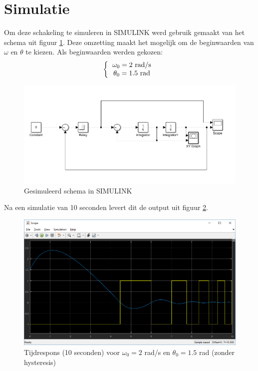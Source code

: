 \documentclass[12pt]{article}
\begin{document}
\section{Simulatie}
Om deze schakeling te simuleren in SIMULINK werd gebruik gemaakt van het schema uit figuur \ref{simulinkschema}. Deze omzetting maakt het mogelijk om de beginwaarden van $\omega$ en $\theta$ te kiezen. Als beginwaarden werden gekozen:
\[ 
\left \{
  \begin{tabular}{c}
  $\omega_0 = 2$ rad/s \\
  $\theta_0 = 1.5$ rad
  \end{tabular}
\right. 
\]
\begin{figure}[]
	\centering
	\includegraphics[width=\textwidth, keepaspectratio]{simulinkschema.png}
	\caption{Gesimuleerd schema in SIMULINK}
	\label{simulinkschema}
\end{figure}
Na een simulatie van 10 seconden levert dit de output uit figuur \ref{output1}.
\begin{figure}[]
	\centering
	\includegraphics[width=\textwidth, keepaspectratio]{output1.png}
	\caption{Tijdrespons (10 seconden) voor $\omega_0 = 2$ rad/s en $\theta_0 = 1.5$ rad (zonder hysteresis)}
	\label{output1}
\end{figure}
\end{document}
